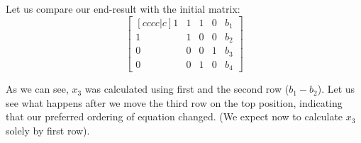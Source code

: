 Let us compare our end-result with the initial matrix:
\begin{equation}
\begin{bmatrix}[cccc|c]
    1 & 1 & 1 & 0 & b_1 \\ 
    1 & 1 & 0 & 0 & b_2 \\ 
    0 & 0 & 0 & 1 & b_3 \\ 
    0 & 0 & 1 & 0 & b_4
\end{bmatrix}
\end{equation}

As we can see, $x_3$ was calculated using first and the second row ($b_1 - b_2$).
Let us see what happens after we move the third row on the top position, indicating that our preferred ordering of equation changed. (We expect now to calculate $x_3$ solely by first row).

